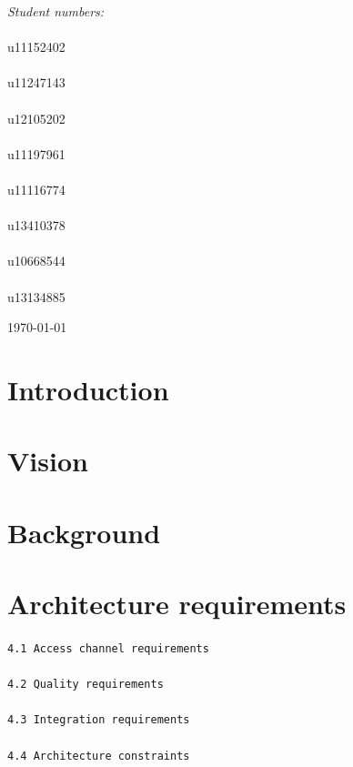 \documentclass[a4paper,12pt]{report}
\begin{document}
\begin{titlepage}
\begin{center}
\begin{minipage}{0.4\textwidth}
\begin{flushright}
\emph{Student numbers:} \\
\emph{}\\
u11152402
\emph{}\\
\emph{}\\
u11247143
\emph{}\\
\emph{}\\
u12105202
\emph{}\\
\emph{}\\
u11197961
\emph{}\\
\emph{}\\
u11116774
\emph{}\\
\emph{}\\
u13410378
\emph{}\\
\emph{}\\
u10668544
\emph{}\\
\emph{}\\
u13134885


\end{flushright}
\end{minipage}
\vfill


{\large \today}
\end{center}
\end{titlepage}
\setcounter{chapter}{1}
\renewcommand{\thesection}{\arabic{section}}


\section{Introduction}



\newpage
\section{Vision}

\textsf{
}

\section{Background}
\textsf{
}

\newpage
\section{Architecture requirements}

\texttt{4.1 Access channel requirements}
\emph{}\\
\emph{}\\
\texttt{4.2 Quality requirements}
\emph{}\\
\emph{}\\
\texttt{4.3 Integration requirements}
\emph{}\\
\emph{}\\
\texttt{4.4 Architecture constraints}
\end{document}

